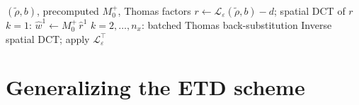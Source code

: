 \documentclass[11pt]{article}
\newcommand{\eps}{\varepsilon}
\newcommand{\dt}{\Delta t}
\newcommand{\Ch}{\mathcal{C}^\eps_h}
\begin{document}
\begin{algorithm}[h]
\caption{$\mathrm{Proj}_{\Ch(\dt)}(\tilde\rho,b)$, per LADMM iteration}
\begin{algorithmic}[1]
\Require $(\tilde\rho,b)$, precomputed $M_0^+$, Thomas factors
\State $r \leftarrow \mathcal{L}_\eps(\tilde\rho,b) - d$; spatial DCT of $r$
\State $k=1$: $\hat w^1 \leftarrow M_0^+\, \hat r^1$
\State $k=2,\dots,n_x$: batched Thomas back-substitution
\State Inverse spatial DCT; apply $\mathcal{L}_\eps^\top$
\end{algorithmic}
\end{algorithm}

\section{Generalizing the ETD scheme}
\label{sec:etd}
\end{document}
